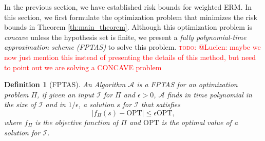 \documentclass[letterpaper]{article} %
\newtheorem{definition}{Definition}
\newcommand{\red}[1]{\textcolor{red}{#1}}
\newcommand{\todo}[1]{\red{\textsc{todo:} #1}}
\begin{document}
In the previous section, we have established risk bounds for weighted ERM. In this section, we first formulate the optimization problem that minimizes the risk bounds in Theorem \ref{th:main_theorem}. 
Although this optimization problem is \emph{concave} unless the hypothesis set is finite, we present a \emph{fully polynomial-time approximation scheme (FPTAS)} to solve this problem.
\todo{@Lucien: maybe we now just mention this instead of presenting the details of this method, but need to point out we are solving a CONCAVE problem}
\begin{definition}[FPTAS]
  An Algorithm $\mathcal{A}$ is a FPTAS for an optimization problem $\Pi$, if given an input $\mathcal{I}$ for $\Pi$ and $\epsilon>0$, $\mathcal{A}$ finds in time polynomial in the size of $\mathcal{I}$ and in $1/\epsilon$, a solution $s$ for $\mathcal{I}$ that satisfies
  \[|f_\Pi(s)-\mathrm{OPT}|\le \epsilon \mathrm{OPT},\]
  where $f_\Pi$ is the objective function of $\Pi$ and $\mathrm{OPT}$ is the optimal value of a solution for $\mathcal{I}$.
\end{definition}
\end{document}
